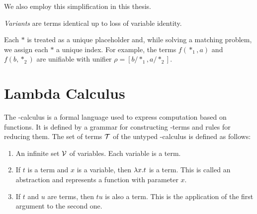 We also employ this simplification in this thesis.

\begin{defn}
  \emph{Variants} are terms identical up to loss of variable identity.
\end{defn}

Each $*$ is treated as a unique placeholder and, while solving a matching problem, we assign each $*$ a unique index. For example, the terms $f(*_{1}, a)$ and $f(b, *_{2})$ are unifiable with unifier $\rho = [b/*_{1}, a/*_{2}]$.






\section{Lambda Calculus}
The \lam -calculus is a formal language used to express computation based on functions. It is defined by a grammar for constructing \lam -terms and rules for reducing them. The set of terms $\mathcal{T}$ of the untyped \lam -calculus is defined as follows:
\begin{enumerate}
  \item An infinite set $\mathcal{V}$ of variables. Each variable is a term.
  \item If $t$ is a term and $x$ is a variable, then $\lambda x. t$ is a term. This is called an abstraction and represents a function with parameter $x$.
  \item If $t$ and $u$ are terms, then $t u$ is also a term. This is the application of the first argument to the second one.
\end{enumerate}

